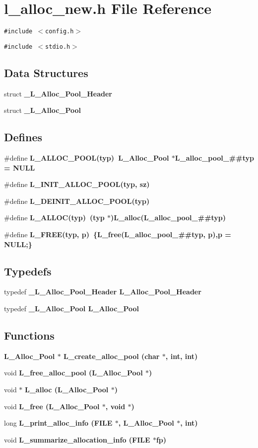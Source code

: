 \section{l\_\-alloc\_\-new.h File Reference}
\label{l__alloc__new_8h}
{\tt \#include $<$config.h$>$}\par
{\tt \#include $<$stdio.h$>$}\par
\subsection*{Data Structures}
\begin{CompactItemize}
\item 
struct \bf{\_\-L\_\-Alloc\_\-Pool\_\-Header}
\item 
struct \bf{\_\-L\_\-Alloc\_\-Pool}
\end{CompactItemize}
\subsection*{Defines}
\begin{CompactItemize}
\item 
\#define \bf{L\_\-ALLOC\_\-POOL}(typ)~\bf{L\_\-Alloc\_\-Pool} $\ast$L\_\-alloc\_\-pool\_\-\#\#typ = NULL
\item 
\#define \bf{L\_\-INIT\_\-ALLOC\_\-POOL}(typ, sz)
\item 
\#define \bf{L\_\-DEINIT\_\-ALLOC\_\-POOL}(typ)
\item 
\#define \bf{L\_\-ALLOC}(typ)~(typ $\ast$)L\_\-alloc(L\_\-alloc\_\-pool\_\-\#\#typ)
\item 
\#define \bf{L\_\-FREE}(typ, p)~\{L\_\-free(L\_\-alloc\_\-pool\_\-\#\#typ, p),p = NULL;\}
\end{CompactItemize}
\subsection*{Typedefs}
\begin{CompactItemize}
\item 
typedef \bf{\_\-L\_\-Alloc\_\-Pool\_\-Header} \bf{L\_\-Alloc\_\-Pool\_\-Header}
\item 
typedef \bf{\_\-L\_\-Alloc\_\-Pool} \bf{L\_\-Alloc\_\-Pool}
\end{CompactItemize}
\subsection*{Functions}
\begin{CompactItemize}
\item 
\bf{L\_\-Alloc\_\-Pool} $\ast$ \bf{L\_\-create\_\-alloc\_\-pool} (char $\ast$, int, int)
\item 
void \bf{L\_\-free\_\-alloc\_\-pool} (\bf{L\_\-Alloc\_\-Pool} $\ast$)
\item 
void $\ast$ \bf{L\_\-alloc} (\bf{L\_\-Alloc\_\-Pool} $\ast$)
\item 
void \bf{L\_\-free} (\bf{L\_\-Alloc\_\-Pool} $\ast$, void $\ast$)
\item 
long \bf{L\_\-print\_\-alloc\_\-info} (FILE $\ast$, \bf{L\_\-Alloc\_\-Pool} $\ast$, int)
\item 
void \bf{L\_\-summarize\_\-allocation\_\-info} (FILE $\ast$fp)
\end{CompactItemize}

